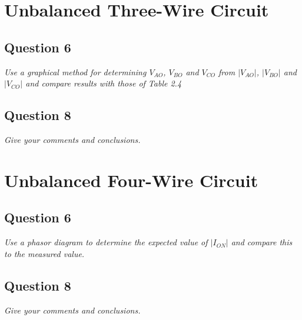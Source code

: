 \documentclass{article}
\begin{document}
\section{Unbalanced Three-Wire Circuit}
   \subsection{Question 6}
   \textit{Use a graphical method for determining $V_{AO}$, $V_{BO}$ and $V_{CO}$ from $|V_{AO}|$, $|V_{BO}|$ and $|V_{CO}|$ and compare results with those of Table 2.4}
   \par

   \subsection{Question 8}
   \textit{Give your comments and conclusions.}
   \par

   \clearpage

\section{Unbalanced Four-Wire Circuit}
  \subsection{Question 6}
  \textit{Use a phasor diagram to determine the expected value of $|I_{ON}|$ and compare this to the measured value.}
  \par
  
  \subsection{Question 8}
  \textit{Give your comments and conclusions.}
  \par
  
  \clearpage
\end{document}
